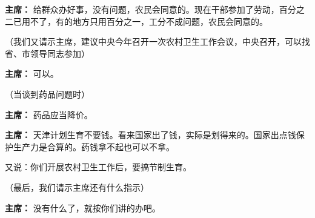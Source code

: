 \begin{duihua}
\item[\textbf{主席：}] 给群众办好事，没有问题，农民会同意的。现在干部参加了劳动，百分之二已用不了，有的地方只用百分之一，工分不成问题，农民会同意的。

（我们又请示主席，建议中央今年召开一次农村卫生工作会议，中央召开，可以找省、市领导同志参加）

\item[\textbf{主席：}] 可以。

（当谈到药品问题时）

\item[\textbf{主席：}] 药品应当降价。

\item[\textbf{主席：}] 天津计划生育不要钱。看来国家出了钱，实际是划得来的。国家出点钱保护生产力是合算的。药钱拿不起也可以不拿。

又说：你们开展农村卫生工作后，要搞节制生育。

（最后，我们请示主席还有什么指示）

\item[\textbf{主席：}] 没有什么了，就按你们讲的办吧。
\end{duihua}

